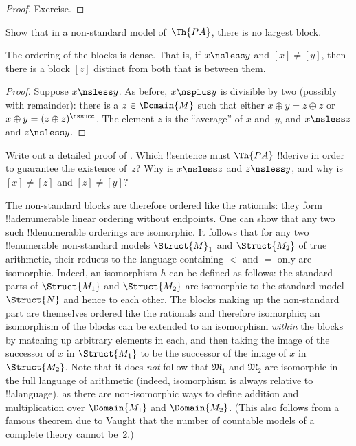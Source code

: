 \documentclass[../../../include/open-logic-section]{subfiles}
\begin{document}
\begin{proof}
Exercise.
\end{proof}

\begin{prob}
Show that in a non-standard model of~$\Th{PA}$, there is no largest
block.
\end{prob}

\begin{prop}
The ordering of the blocks is dense. That is, if $x \nsless y$ and
$[x] \neq [y]$, then there is a block $[z]$ distinct from both that is
between them.
\end{prop}

\begin{proof}
Suppose $x \nsless y$. As before, $x \nsplus y$ is divisible by two
(possibly with remainder): there is a $z \in \Domain{M}$ such that
either $x \oplus y = z \oplus z$ or $x \oplus y = (z \oplus
z)^\nssucc$. The element $z$ is the ``average'' of $x$ and~$y$, and $x
\nsless z$ and $z \nsless y$.
\end{proof}

\begin{prob}
Write out a detailed proof of
. Which !!{sentence} must
$\Th{PA}$ !!{derive} in order to guarantee the existence of~$z$? Why
is $x \nsless z$ and $z \nsless y$, and why is $[x] \neq [z]$ and $[z]
\neq [y]$?
\end{prob}

\begin{explain}
The non-standard blocks are therefore ordered like the rationals: they
form !!a{denumerable} linear ordering without endpoints.  One can show
that any two such !!{denumerable} orderings are isomorphic. It follows
that for any two !!{enumerable} non-standard models $\Struct{M}_1$ and
$\Struct{M_2}$ of true arithmetic, their reducts to the language
containing $<$ and $=$ only are isomorphic. Indeed, an isomorphism $h$
can be defined as follows: the standard parts of $\Struct{M_1}$ and
$\Struct{M_2}$ are isomorphic to the standard model $\Struct{N}$ and
hence to each other. The blocks making up the non-standard part are
themselves ordered like the rationals and therefore isomorphic; an
isomorphism of the blocks can be extended to an isomorphism
\emph{within} the blocks by matching up arbitrary elements in each,
and then taking the image of the successor of $x$ in $\Struct{M_1}$ to
be the successor of the image of $x$ in $\Struct{M_2}$. Note that it
does \emph{not} follow that $\mathfrak{M}_1$ and $\mathfrak{M}_2$ are
isomorphic in the full language of arithmetic (indeed, isomorphism is
always relative to !!a{language}), as there are non-isomorphic ways to
define addition and multiplication over $\Domain{M_1}$ and
$\Domain{M_2}$. (This also follows from a famous theorem due to Vaught
that the number of countable models of a complete theory cannot be~2.)
\end{explain}
\end{document}
